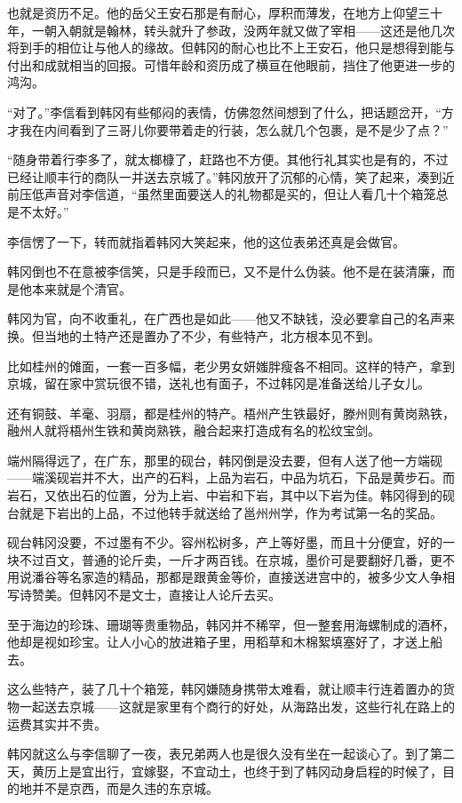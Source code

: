 也就是资历不足。他的岳父王安石那是有耐心，厚积而薄发，在地方上仰望三十年，一朝入朝就是翰林，转头就升了参政，没两年就又做了宰相——这还是他几次将到手的相位让与他人的缘故。但韩冈的耐心也比不上王安石，他只是想得到能与付出和成就相当的回报。可惜年龄和资历成了横亘在他眼前，挡住了他更进一步的鸿沟。

“对了。”李信看到韩冈有些郁闷的表情，仿佛忽然间想到了什么，把话题岔开，“方才我在内间看到了三哥儿你要带着走的行装，怎么就几个包裹，是不是少了点？”

“随身带着行李多了，就太榔槺了，赶路也不方便。其他行礼其实也是有的，不过已经让顺丰行的商队一并送去京城了。”韩冈放开了沉郁的心情，笑了起来，凑到近前压低声音对李信道，“虽然里面要送人的礼物都是买的，但让人看几十个箱笼总是不太好。”

李信愣了一下，转而就指着韩冈大笑起来，他的这位表弟还真是会做官。

韩冈倒也不在意被李信笑，只是手段而已，又不是什么伪装。他不是在装清廉，而是他本来就是个清官。

韩冈为官，向不收重礼，在广西也是如此——他又不缺钱，没必要拿自己的名声来换。但当地的土特产还是置办了不少，有些特产，北方根本见不到。

比如桂州的傩面，一套一百多幅，老少男女妍媸胖瘦各不相同。这样的特产，拿到京城，留在家中赏玩很不错，送礼也有面子，不过韩冈是准备送给儿子女儿。

还有铜鼓、羊毫、羽扇，都是桂州的特产。梧州产生铁最好，滕州则有黄岗熟铁，融州人就将梧州生铁和黄岗熟铁，融合起来打造成有名的松纹宝剑。

端州隔得远了，在广东，那里的砚台，韩冈倒是没去要，但有人送了他一方端砚——端溪砚岩并不大，出产的石料，上品为岩石，中品为坑石，下品是黄步石。而岩石，又依出石的位置，分为上岩、中岩和下岩，其中以下岩为佳。韩冈得到的砚台就是下岩出的上品，不过他转手就送给了邕州州学，作为考试第一名的奖品。

砚台韩冈没要，不过墨有不少。容州松树多，产上等好墨，而且十分便宜，好的一块不过百文，普通的论斤卖，一斤才两百钱。在京城，墨价可是要翻好几番，更不用说潘谷等名家造的精品，那都是跟黄金等价，直接送进宫中的，被多少文人争相写诗赞美。但韩冈不是文士，直接让人论斤去买。

至于海边的珍珠、珊瑚等贵重物品，韩冈并不稀罕，但一整套用海螺制成的酒杯，他却是视如珍宝。让人小心的放进箱子里，用稻草和木棉絮填塞好了，才送上船去。

这么些特产，装了几十个箱笼，韩冈嫌随身携带太难看，就让顺丰行连着置办的货物一起送去京城——这就是家里有个商行的好处，从海路出发，这些行礼在路上的运费其实并不贵。

韩冈就这么与李信聊了一夜，表兄弟两人也是很久没有坐在一起谈心了。到了第二天，黄历上是宜出行，宜嫁娶，不宜动土，也终于到了韩冈动身启程的时候了，目的地并不是京西，而是久违的东京城。

